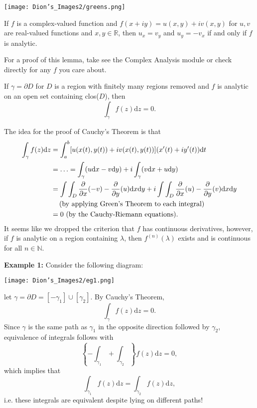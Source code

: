 \centerline{\texttt{[image: Dion's\_Images2/greens.png]}}

\begin{lem}
If $f$ is a complex-valued function and $f(x+iy) = u(x,y) + iv(x,y)$ for $u,v$ are real-valued functions and $x,y \in \mathbb{R}$,
then $u_x = v_y$ and $u_y = - v_x$ if and only if $f$ is analytic.
\end{lem}
For a proof of this lemma, take see the Complex Analysis module or check directly for any $f$ you care about.

\begin{thm}
If $\gamma = \partial D$ for $D$ is a region with finitely many regions removed and $f$ is analytic on an open set containing clos($D$), then
$$\int_\gamma f(z) \mathrm{d}z = 0.$$
\end{thm}
The idea for the proof of Cauchy's Theorem is that
\begin{align*}
\int_\gamma f(z) \mathrm{d}z &= \int_a^b [u(x(t), y(t)) + iv(x(t),y(t))](x'(t) + iy'(t))\mathrm{d}t \\
&= \ldots = \int_\gamma (u \mathrm{d}x - v \mathrm{d}y) + i\int_\gamma (v \mathrm{d}x + u \mathrm{d}y) \\
&= \int\int_D \frac{\partial}{\partial x}(-v) - \frac{\partial}{\partial y}(u) \mathrm{d}x\mathrm{d}y + i \int\int_D \frac{\partial}{\partial x}(u) - \frac{\partial}{\partial y}(v) \mathrm{d}x\mathrm{d}y \\
&\hspace{1pc}\mbox{(by applying Green's Theorem to each integral)} \\
&= 0 \mbox{ (by the Cauchy-Riemann equations)}.
\end{align*}
It seems like we dropped the criterion that $f$ has continuous derivatives, however, if $f$ is analytic on a region containing $\lambda$, then $f^{(n)}(\lambda)$ exists and is continuous for all $n\in\mathbb{N}$.

\medskip\textbf{Example 1:} Consider the following diagram:

\centerline{\texttt{[image: Dion's\_Images2/eg1.png]}}

let $\gamma = \partial D = [-\gamma_1] \cup [\gamma_2]$.
By Cauchy's Theorem,
$$\int_\gamma f(z) \mathrm{d}z = 0.$$
Since $\gamma$ is the same path as $\gamma_1$ in the opposite direction followed by $\gamma_2$, equivalence of integrals follows with
$$\left\{-\int_{\gamma_1} + \int_{\gamma_2}\right\}f(z) \mathrm{d}z = 0,$$
which implies that
$$\int_{\gamma_1}f(z) \mathrm{d}z = \int_{\gamma_2}f(z) \mathrm{d}z,$$
i.e. these integrals are equivalent despite lying on different paths!


